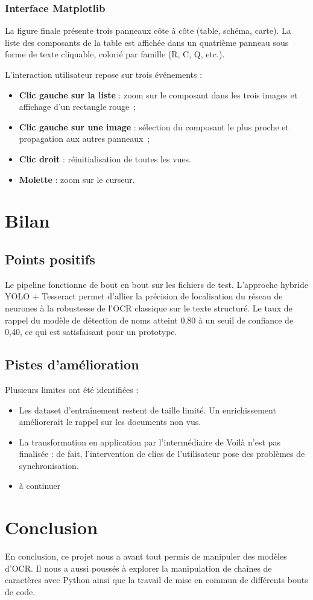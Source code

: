 \documentclass[a4paper,11pt]{article} %
\begin{document}
\subsubsection{Interface Matplotlib}

La figure finale présente trois panneaux côte à côte (table, schéma, carte).
La liste des composants de la table est affichée dans un quatrième panneau
sous forme de texte cliquable, colorié par famille (R, C, Q, etc.).

L'interaction utilisateur repose sur trois événements :
\begin{itemize}
  \item \textbf{Clic gauche sur la liste} : zoom sur le composant dans les trois images
        et affichage d'un rectangle rouge~;
  \item \textbf{Clic gauche sur une image} : sélection du composant le plus proche et propagation aux autres panneaux~;
  \item \textbf{Clic droit} : réinitialisation de toutes les vues.
  \item \textbf{Molette} : zoom sur le curseur.
\end{itemize}

\section*{Bilan}

\subsection*{Points positifs}

Le pipeline fonctionne de bout en bout sur les fichiers de test.
L'approche hybride YOLO + Tesseract permet d'allier la précision de localisation du
réseau de neurones à la robustesse de l'OCR classique sur le texte structuré.
Le taux de rappel du modèle de détection de noms atteint 0,80 à un seuil de confiance
de 0,40, ce qui est satisfaisant pour un prototype.

\subsection*{Pistes d'amélioration}

Plusieurs limites ont été identifiées :
\begin{itemize}
    \item Les dataset d'entraînement restent de taille limité.
        Un enrichissement améliorerait le rappel sur les documents non vus.
    \item La transformation en application par l'intermédiaire de Voilà n'est pas finalisée : de fait, l'intervention de clics de l'utilisateur pose des problèmes de synchronisation. 
        
    \item à continuer
\end{itemize}

\section*{Conclusion}

En conclusion, ce projet nous a avant tout permis de manipuler des modèles d'OCR. Il nous a aussi poussés à explorer la manipulation de chaînes de caractères avec Python ainsi que la travail de mise en commun de différents bouts de code.


\end{document}
